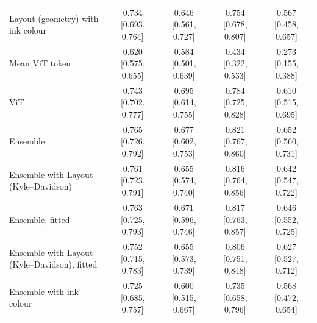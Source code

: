 \begin{table}[htbp]
\begin{tabular}{lcccc}
    Layout (geometry) with ink colour & 0.734 [0.693, 0.764] & 0.646 [0.561, 0.727] & 0.754 [0.678, 0.807] & 0.567 [0.458, 0.657] \\
    Mean ViT token & 0.620 [0.575, 0.655] & 0.584 [0.501, 0.639] & 0.434 [0.322, 0.533] & 0.273 [0.155, 0.388] \\
    ViT & 0.743 [0.702, 0.777] & 0.695 [0.614, 0.755] & 0.784 [0.725, 0.828] & 0.610 [0.515, 0.695] \\
    Ensemble & 0.765 [0.726, 0.792] & 0.677 [0.602, 0.753] & 0.821 [0.767, 0.860] & 0.652 [0.560, 0.731] \\
    Ensemble with Layout (Kyle--Davidson) & 0.761 [0.723, 0.791] & 0.655 [0.574, 0.740] & 0.816 [0.764, 0.856] & 0.642 [0.547, 0.722] \\
    Ensemble, fitted & 0.763 [0.725, 0.793] & 0.671 [0.596, 0.746] & 0.817 [0.763, 0.857] & 0.646 [0.552, 0.725] \\
    Ensemble with Layout (Kyle--Davidson), fitted & 0.752 [0.715, 0.783] & 0.655 [0.573, 0.739] & 0.806 [0.751, 0.848] & 0.627 [0.527, 0.712] \\
    Ensemble with ink colour & 0.725 [0.685, 0.757] & 0.600 [0.515, 0.667] & 0.735 [0.658, 0.796] & 0.568 [0.472, 0.654] \\
    \bottomrule
  \end{tabular}
\end{table}
